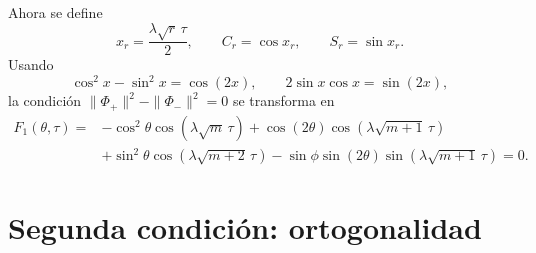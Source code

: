 Ahora se define
\begin{equation}
  x_r=\frac{\lambda\sqrt r\,\tau}{2},
  \qquad
  C_r=\cos x_r,
  \qquad
  S_r=\sin x_r.
\end{equation}
Usando
\begin{equation}
  \cos^2x-\sin^2x=\cos(2x),
  \qquad
  2\sin x\cos x=\sin(2x),
\end{equation}
la condici\'on $\|\Phi_+\|^2-\|\Phi_-\|^2=0$ se transforma en
\begin{equation}
  \boxed{
  \begin{aligned}
  F_1(\theta,\tau)
  ={}&
  -\cos^2\theta\cos(\lambda\sqrt m\,\tau)
  +\cos(2\theta)\cos(\lambda\sqrt{m+1}\,\tau)
  \\
  &+\sin^2\theta\cos(\lambda\sqrt{m+2}\,\tau)
  -\sin\phi\sin(2\theta)
  \sin(\lambda\sqrt{m+1}\,\tau)
  =0.
  \end{aligned}
  }
\end{equation}

\section{Segunda condici\'on: ortogonalidad}

